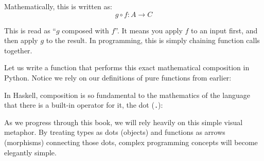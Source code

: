 Mathematically, this is written as:
\[ g \circ f : A \rightarrow C \]

This is read as ``$g$ composed with $f$''. It means you apply $f$ to an input first, and then apply $g$ to the result. In programming, this is simply chaining function calls together.

Let us write a function that performs this exact mathematical composition in Python. Notice we rely on our definitions of pure functions from earlier:



In Haskell, composition is so fundamental to the mathematics of the language that there is a built-in operator for it, the dot (\texttt{.}):



As we progress through this book, we will rely heavily on this simple visual metaphor. By treating types as dots (objects) and functions as arrows (morphisms) connecting those dots, complex programming concepts will become elegantly simple.
